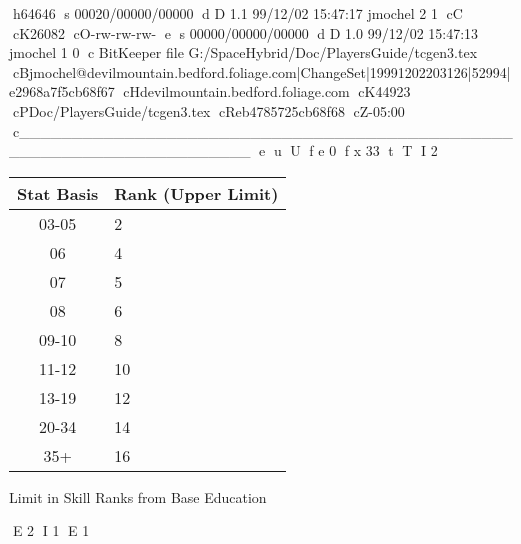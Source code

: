 h64646
s 00020/00000/00000
d D 1.1 99/12/02 15:47:17 jmochel 2 1
cC
cK26082
cO-rw-rw-rw-
e
s 00000/00000/00000
d D 1.0 99/12/02 15:47:13 jmochel 1 0
c BitKeeper file G:/SpaceHybrid/Doc/PlayersGuide/tcgen3.tex
cBjmochel@devilmountain.bedford.foliage.com|ChangeSet|19991202203126|52994|e2968a7f5cb68f67
cHdevilmountain.bedford.foliage.com
cK44923
cPDoc/PlayersGuide/tcgen3.tex
cReb4785725cb68f68
cZ-05:00
c______________________________________________________________________
e
u
U
f e 0
f x 33
t
T
I 2

\begin{SHTable}[h]
	\begin{tabular}{c|l}
	Stat Basis & Rank (Upper Limit) \\
	\hline
	03-05		& 2 \\
	06			& 4 \\
	07			& 5 \\
	08			& 6 \\
	09-10		& 8 \\
	11-12		& 10 \\
	13-19		& 12 \\
	20-34		& 14 \\
	35+			& 16 \\
    \end{tabular}
    \caption{Limit in Skill Ranks from Base Education} \label{Table:SkillLimit}
\end{SHTable}

E 2
I 1
E 1
